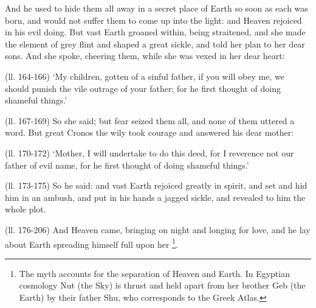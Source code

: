 And he used to hide them all away in a secret place of Earth so soon as each
was born, and would not suffer them to come up into the light: and Heaven
rejoiced in his evil doing. But vast Earth groaned within, being straitened,
and she made the element of grey flint and shaped a great sickle, and told her
plan to her dear sons. And she spoke, cheering them, while she was vexed in her
dear heart:

(ll. 164-166) ‘My children, gotten of a sinful father, if you will obey
me, we should punish the vile outrage of your father; for he first thought of
doing shameful things.’

(ll. 167-169) So she said; but fear seized them all, and none of them uttered a
word. But great Cronos the wily took courage and answered his dear mother:

(ll. 170-172) ‘Mother, I will undertake to do this deed, for I reverence
not our father of evil name, for he first thought of doing shameful
things.’

(ll. 173-175) So he said: and vast Earth rejoiced greatly in spirit, and set
and hid him in an ambush, and put in his hands a jagged sickle, and revealed to
him the whole plot.

(ll. 176-206) And Heaven came, bringing on night and longing for love, and he
lay about Earth spreading himself full upon her \footnote{The myth accounts for the
separation of Heaven and Earth. In Egyptian cosmology Nut (the Sky) is thrust
and held apart from her brother Geb (the Earth) by their father Shu, who
corresponds to the Greek Atlas.}.

